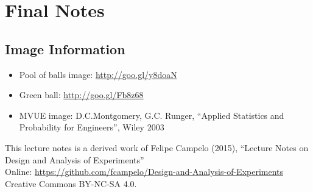 \documentclass[10pt]{beamer}
\begin{document}
\section{Final Notes}
\subsection{Image Information}
\begin{frame}
  {\tiny
  \begin{itemize}
  \item Pool of balls image: \url{http://goo.gl/y8doaN}
  \item Green ball: \url{http://goo.gl/Fb8z68}
  \item MVUE image: D.C.Montgomery, G.C. Runger, ``Applied Statistics and Probability for Engineers'', Wiley 2003
  \end{itemize}
  }
  \medskip
  \begin{block}{This lecture notes is a derived work of}
    Felipe Campelo (2015), ``Lecture Notes on Design and Analysis of Experiments''\\
    Online: \url{https://github.com/fcampelo/Design-and-Analysis-of-Experiments}
    Creative Commons BY-NC-SA 4.0.
  \end{block}
\end{frame}
\end{document}
